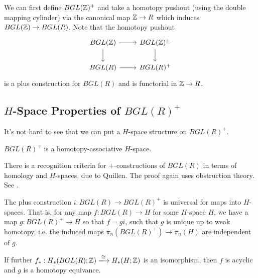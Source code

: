 We can first define $BGL(\mathbb{Z})^+$ and take a homotopy pushout (using the double mapping cylinder) via the canonical map $\mathbb{Z} \to R$ which induces $BGL(\mathbb{Z}) \to BGL(R)$.
Note that the homotopy pushout
\[
\begin{tikzcd}
  BGL(\Z) \arrow[r] \arrow[d] & BGL(\Z)^+ \arrow[d] \\
  BGL(R) \arrow[r] & BGL(R)^+
\end{tikzcd}
\]
is a plus construction for $BGL(R)$ and is functorial in $\mathbb{Z} \to R$.

\subsection{$H$-Space Properties of $BGL(R)^+$}

It's not hard to see that we can put a $H$-space structure on $BGL(R)^+$.
\begin{proposition}
$BGL(R)^+$ is a homotopy-associative $H$-space.
\end{proposition}

There is a recognition criteria for $+$-constructions of $BGL(R)$ in terms of homology and $H$-spaces, due to Quillen.
The proof again uses obstruction theory. See \cite{Gersten}.

\begin{theorem}
The plus construction $i : BGL(R) \to BGL(R)^+$ is universal for maps into $H$-spaces. That is, for any map
$f : BGL(R) \to H$ for some $H$-space $H$, we have a map $g : BGL(R)^+ \to H$ so that $f = g i$,
such that $g$ is unique up to weak homotopy, i.e. the induced maps $\pi_n(BGL(R)^+) \to \pi_n(H)$ are independent of $g$.
\end{theorem}

\begin{proposition}\label{prop:acyclic_H_space}
If further $f_* : H_*(BGL(R);\Z) \xlongrightarrow{\cong} H_*(H;\Z)$ is an isomorphism, then $f$ is acyclic
and $g$ is a homotopy equivance.
\end{proposition}

